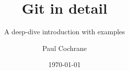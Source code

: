 \title{Git in detail}
\subtitle{A deep-dive introduction with examples}
\author{Paul Cochrane}
\date{\today}
